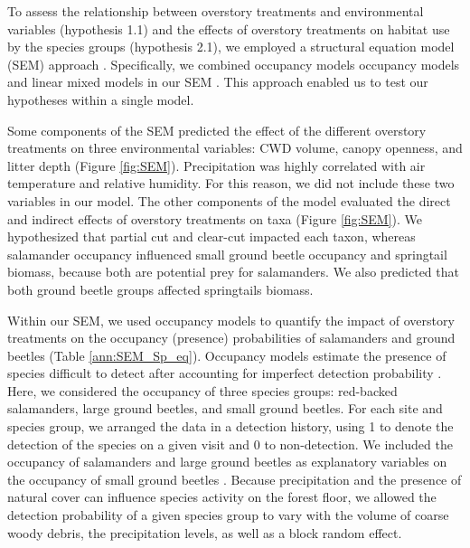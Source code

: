 To assess the relationship between overstory treatments and environmental variables (hypothesis 1.1) and the effects of overstory treatments on habitat use by the species groups (hypothesis 2.1), 
we employed a structural equation model (SEM) approach \citep{graceSpecificationStructuralEquation2010}. 
Specifically, we combined occupancy models occupancy models and linear mixed models in our SEM \citep{mackenzieOccupancyEstimationModeling2006a,graceSpecificationStructuralEquation2010,josephIntegratingOccupancyModels2016}.
This approach enabled us to test our hypotheses within a single model. 

Some components of the SEM predicted the effect of the different overstory treatments on three environmental variables: CWD volume, canopy openness, and litter depth (Figure \ref{fig:SEM}). 
Precipitation was highly correlated with air temperature and relative humidity. 
For this reason, we did not include these two variables in our model. 
The other components of the model evaluated the direct and indirect effects of overstory treatments on taxa (Figure \ref{fig:SEM}). 
We hypothesized that partial cut and clear-cut impacted each taxon, whereas salamander occupancy influenced small ground beetle occupancy and springtail biomass, because both are potential prey for salamanders. 
We also predicted that both ground beetle groups affected springtails biomass.

Within our SEM, we used occupancy models to quantify the impact of overstory treatments on the occupancy (presence) probabilities of salamanders and ground beetles (Table \ref{ann:SEM_Sp_eq}). 
Occupancy models estimate the presence of species difficult to detect after accounting for imperfect detection probability \citep{mackenzieEstimatingSiteOccupancy2002,baileyEstimatingSiteOccupancy2004,mazerolleMakingGreatLeaps2007,spiersEstimatingSpeciesMisclassification2022}. 
Here, we considered the occupancy of three species groups: red-backed salamanders, large ground beetles, and small ground beetles. 
For each site and species group, we arranged the data in a detection history, using 1 to denote the detection of the species on a given visit and 0 to non-detection. 
We included the occupancy of salamanders and large ground beetles as explanatory variables on the occupancy of small ground beetles \citep{Feldman2023Beaveractivity}. 
Because precipitation and the presence of natural cover can influence species activity on the forest floor, 
we allowed the detection probability of a given species group to vary with the volume of coarse woody debris, the precipitation levels, as well as a block random effect. 

